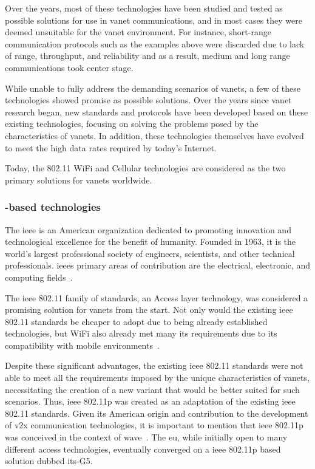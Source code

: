 Over the years, most of these technologies have been studied and tested as possible solutions for use in \gls{vanet} communications, and in most cases they were deemed unsuitable for the \gls{vanet} environment. For instance, short-range communication protocols such as the examples above were discarded due to lack of range, throughput, and reliability and as a result, medium and long range communications took center stage.

While unable to fully address the demanding scenarios of \glspl{vanet}, a few of these technologies showed promise as possible solutions. Over the years since \gls{vanet} research began, new standards and protocols have been developed based on these existing technologies, focusing on solving the problems posed by the characteristics of \glspl{vanet}. In addition, these technologies themselves have evolved to meet the high data rates required by today's Internet.

Today, the  802.11 WiFi and Cellular technologies are considered as the two primary solutions for \glspl{vanet} worldwide.

\subsubsection[IEEE-based technologies]{-based technologies}
The \gls{ieee} is an American organization dedicated to promoting innovation and technological excellence for the benefit of humanity. Founded in 1963, it is the world's largest professional society of engineers, scientists, and other technical professionals. \glspl{ieee} primary areas of contribution are the electrical, electronic, and computing fields~\cite{noauthor_history_nodate}.

The \gls{ieee} 802.11 family of standards, an Access layer technology, was considered a promising solution for \glspl{vanet} from the start. Not only would the existing \gls{ieee} 802.11 standards be cheaper to adopt due to being already established technologies, but WiFi also already met many \gls{its} requirements due to its compatibility with mobile environments~\cite{rohde__schwarz_intelligent_2019}.

Despite these significant advantages, the existing \gls{ieee} 802.11 standards were not able to meet all the requirements imposed by the unique characteristics of \glspl{vanet}, necessitating the creation of a new variant that would be better suited for such scenarios. Thus, \gls{ieee} 802.11p was created as an adaptation of the existing \gls{ieee} 802.11 standards. Given its American origin and contribution to the development of \gls{v2x} communication technologies, it is important to mention that \gls{ieee} 802.11p was conceived in the context of \gls{wave}~\cite{jiang_ieee_2008}. The \gls{eu}, while initially open to many different access technologies, eventually converged on a \gls{ieee} 802.11p based solution dubbed \gls{its}-G5.

